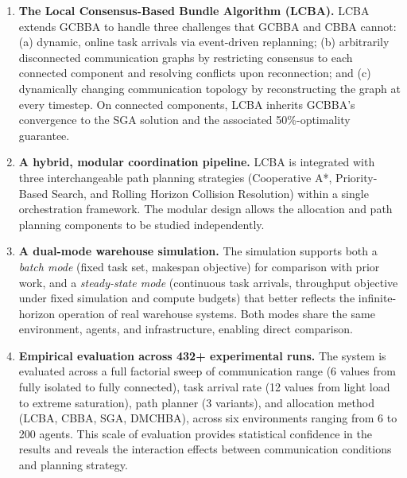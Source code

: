 \begin{enumerate}
  \item \textbf{The Local Consensus-Based Bundle Algorithm (LCBA).}
        LCBA extends GCBBA to handle three challenges that GCBBA and CBBA
        cannot:
        (a) dynamic, online task arrivals via event-driven replanning;
        (b) arbitrarily disconnected communication graphs by restricting
            consensus to each connected component and resolving conflicts
            upon reconnection; and
        (c) dynamically changing communication topology by reconstructing
            the graph at every timestep.
        On connected components, LCBA inherits GCBBA's convergence to the SGA
        solution and the associated 50\%-optimality guarantee.

  \item \textbf{A hybrid, modular coordination pipeline.}
        LCBA is integrated with three interchangeable path planning strategies
        (Cooperative A*, Priority-Based Search, and Rolling Horizon Collision
        Resolution) within a single orchestration framework.
        The modular design allows the allocation and path planning components
        to be studied independently.

  \item \textbf{A dual-mode warehouse simulation.}
        The simulation supports both a \emph{batch mode} (fixed task set,
        makespan objective) for comparison with prior work, and a
        \emph{steady-state mode} (continuous task arrivals, throughput
        objective under fixed simulation and compute budgets) that better
        reflects the infinite-horizon operation of real warehouse systems.
        Both modes share the same environment, agents, and infrastructure,
        enabling direct comparison.

  \item \textbf{Empirical evaluation across 432+ experimental runs.}
        The system is evaluated across a full factorial sweep of communication
        range (6 values from fully isolated to fully connected),
        task arrival rate (12 values from light load to extreme saturation),
        path planner (3 variants), and allocation method (LCBA, CBBA, SGA, DMCHBA),
        across six environments ranging from 6 to 200 agents.
        This scale of evaluation provides statistical confidence in the results
        and reveals the interaction effects between communication conditions
        and planning strategy.


\end{enumerate}
